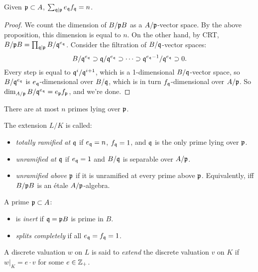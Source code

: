 \documentclass[11pt]{amsart}
\begin{document}
\begin{prop}
Given $\mathfrak{p}\subset A$, $\sum_{\mathfrak{q} \mid \mathfrak{p}} e_{\mathfrak{q}} f_{\mathfrak{q}} = n$. 
\end{prop}


\begin{proof}
We count the dimension of $B/\mathfrak{p} B$ as a $A/\mathfrak{p}$-vector space. By the above proposition, this dimension is equal to $n$. On the other hand, by CRT, $B/\mathfrak{p} B = \prod_{\mathfrak{q}|\mathfrak{p}} B/\mathfrak{q}^{e_{\mathfrak{q}}}$. Consider the filtration of $B/\mathfrak{q}$-vector spaces:
\[B/\mathfrak{q}^{e_{\mathfrak{q}}} \supset \mathfrak{q}/\mathfrak{q}^{e_{\mathfrak{q}}} \supset\dots\supset \mathfrak{q}^{e_{\mathfrak{q}}-1}/\mathfrak{q}^{e_{\mathfrak{q}}} \supset 0.\]
Every step is equal to $\mathfrak{q}^i/\mathfrak{q}^{i+1}$, which is a 1-dimensional $B/\mathfrak{q}$-vector space, so $B/\mathfrak{q}^{e_{\mathfrak{q}}}$ is $e_{\mathfrak{q}}$-dimensional over $B/\mathfrak{q}$, which is in turn $f_{\mathfrak{q}}$-dimensional over $A/\mathfrak{p}$. So $\dim_{A/\mathfrak{p}} B/\mathfrak{q}^{e_{\mathfrak{q}}} = e_{\mathfrak{p}} f_{\mathfrak{p}}$, and we're done.
\end{proof}

\begin{cor}
There are at most $n$ primes lying over $\mathfrak{p}$.
\end{cor}

\begin{defn}
The extension $L/K$ is called:
\begin{itemize}
    \item \emph{totally ramified at $\mathfrak{q}$} if $e_{\mathfrak{q}} = n$, $f_{\mathfrak{q}} = 1$, and $\mathfrak{q}$ is the only prime lying over $\mathfrak{p}$.
    \item \emph{unramified at $\mathfrak{q}$} if $e_{\mathfrak{q}} = 1$ and $B/\mathfrak{q}$ is separable over $A/\mathfrak{p}$.
    \item \emph{unramified above $\mathfrak{p}$} if it is unramified at every prime above $\mathfrak{p}$. Equivalently, iff $B/\mathfrak{p} B$ is an \'etale $A/\mathfrak{p}$-algebra.
\end{itemize}
\end{defn}

\begin{defn}
A prime $\mathfrak{p}\subset A$:
\begin{itemize}
    \item is \emph{inert} if $\mathfrak{q} = \mathfrak{p} B$ is prime in $B$.
    \item \emph{splits completely} if all $e_{\mathfrak{q}} = f_{\mathfrak{q}} = 1$.
\end{itemize}
\end{defn}

\begin{defn}
A discrete valuation $w$ on $L$ is said to \emph{extend} the discrete valuation $v$ on $K$ if $w|_K = e\cdot v$ for some $e\in \mathbb{Z}_{+}$.
\end{defn}
\end{document}
